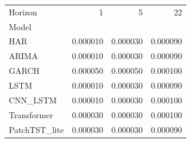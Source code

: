 \begin{tabular}{lrrr}
\toprule
Horizon & 1 & 5 & 22 \\
Model &  &  &  \\
\midrule
HAR & 0.000010 & 0.000030 & 0.000090 \\
ARIMA & 0.000010 & 0.000030 & 0.000090 \\
GARCH & 0.000050 & 0.000050 & 0.000100 \\
LSTM & 0.000010 & 0.000030 & 0.000090 \\
CNN_LSTM & 0.000010 & 0.000030 & 0.000100 \\
Transformer & 0.000030 & 0.000030 & 0.000100 \\
PatchTST_lite & 0.000030 & 0.000030 & 0.000090 \\
\bottomrule
\end{tabular}
